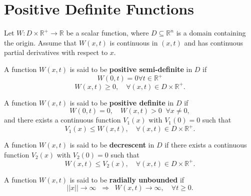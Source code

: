 \section{Positive Definite Functions}

Let $W : D \times \mathbb{R}^+ \to \mathbb{R}$ be a scalar function, where $D \subseteq \mathbb{R}^n$ is a domain containing the origin.  
Assume that $W(x,t)$ is continuous in $(x,t)$ and has continuous partial derivatives with respect to $x$.

\begin{definition}
A function $W(x,t)$ is said to be \textbf{positive semi-definite} in $D$ if
\[
W(0,t) = 0 \forall t \in \mathbb{R}^+
\]
\[
W(x,t) \geq 0, \quad \forall (x,t) \in D \times \mathbb{R}^+.
\]
\end{definition}

\begin{definition}
A function $W(x,t)$ is said to be \textbf{positive definite} in $D$ if
\[
W(0,t) = 0, \quad W(x,t) > 0 \;\; \forall x \neq 0,
\]
and there exists a continuous function $V_1(x)$ with $V_1(0)=0$ such that
\[
V_1(x) \leq W(x,t), \quad \forall (x,t) \in D \times \mathbb{R}^+.
\]
\end{definition}

\begin{definition}
A function $W(x,t)$ is said to be \textbf{decrescent} in $D$ if there exists a continuous function $V_2(x)$ with $V_2(0)=0$ such that
\[
W(x,t) \leq V_2(x), \quad \forall (x,t) \in D \times \mathbb{R}^+.
\]
\end{definition}

\begin{definition}
A function $W(x,t)$ is said to be \textbf{radially unbounded} if
\[
||x|| \to \infty \;\; \Rightarrow \;\; W(x,t) \to \infty, \quad \forall t \geq 0.
\]
\end{definition}

